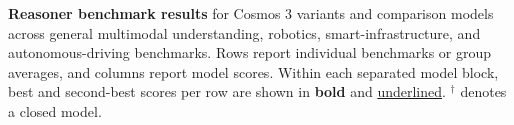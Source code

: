 \newcommand{\reasonerModelHeader}[1]{\rotatebox[origin=c]{90}{\makecell[c]{\tiny #1}}}
\newcommand{\reasonerGroupCell}[4][1]{\multirow{#2}{*}{\rotatebox[origin=c]{90}{\scalebox{#1}{\makecell[c]{\textbf{#3}\\#4 benchmarks}}}}}
\newcommand{\reasonerAvgCell}[1]{\cellcolor{black!4}#1}
\newcommand{\reasonerAvgLastCell}[1]{\multicolumn{1}{>{\columncolor{black!4}[\tabcolsep][0pt]}c@{}}{#1}}
\begin{table}[p]
    \centering
    \tiny
    \caption{ \textbf{Reasoner benchmark results} for Cosmos 3 variants and comparison models across general multimodal understanding, robotics, smart-infrastructure, and autonomous-driving benchmarks. Rows report individual benchmarks or group averages, and columns report model scores. Within each separated model block, best and second-best scores per row are shown in \textbf{bold} and \underline{underlined}. $^\dagger$ denotes a closed model.
    }
    

\end{table}
